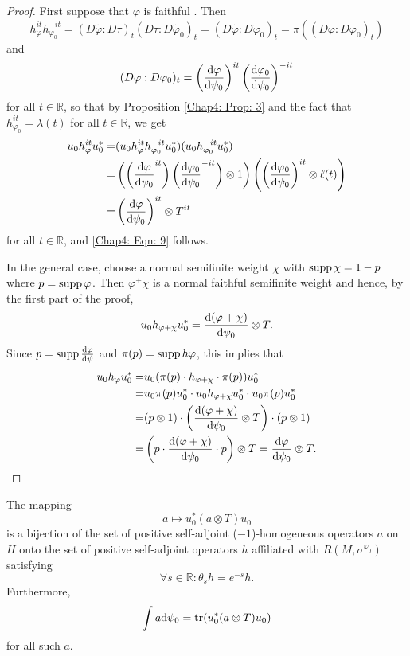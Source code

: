 \begin{proof}
    First suppose that $\varphi$ is faithful . Then
    \[
        h_\varphi^{it}h_{\varphi_0}^{-it}=(D\tilde{\varphi}:D\tau)_t(D\tau:D\tilde{\varphi}_0)_t=(D\tilde{\varphi}:D\tilde{\varphi}_0)_t=\pi((D\varphi:D\varphi_0)_t)
    \]
    and
    \[
        (D\varphi:D\varphi_0)_t=\left( \dv{\varphi}{\psi_0} \right)^{it}\left( \dv{\varphi_0}{\psi_0} \right)^{-it}
    \]
    for all $t\in \mathbb{R}$, so that by Proposition \ref{Chap4: Prop: 3} and the fact that $h_{\varphi_0}^{it}=\lambda(t)$ for all $t\in \mathbb{R}$, we get
    \[
        \begin{split}
            u_0h_\varphi^{it}u_0^*=&(u_0h_\varphi^{it}h_{\varphi_0}^{-it}u_0^*)(u_0h_{\varphi_0}^{-it}u_0^*)\\
            =&\left( \left( \dv{\varphi}{\psi_0}^{it}\right) \left( \dv{\varphi_0}{\psi_0}^{-it}  \right)\otimes 1 \right)\left( \left( \dv{\varphi_0}{\psi_0} \right)^{it}\otimes \ell(t) \right)\\
            =&\left( \dv{\varphi}{\psi_0} \right)^{it}\otimes T^{it}
        \end{split}
    \]
    for all $t\in \mathbb{R}$, and \eqref{Chap4: Eqn: 9} follows.\par
    In the general case, choose a normal semifinite weight $\chi$ with $\operatorname{supp} \chi=1-p$ where $p = \operatorname{supp} \varphi$. Then $\varphi^+ \chi$ is a normal faithful semifinite weight and hence, by the first part of the proof,
    \[
        u_0h_{\varphi+\chi}u_0^*=\dv{(\varphi+\chi)}{\psi_0}\otimes T.
    \]
    Since $p=\operatorname{supp} \dv{\varphi}{\psi}$ and $\pi(p)=\operatorname{supp} h\varphi$, this implies that
    \[
        \begin{split}
            u_0h_\varphi u_0^*=&u_0(\pi(p)\cdot h_{\varphi+\chi}\cdot \pi(p))u_0^*\\
            =&u_0\pi(p)u_0^*\cdot u_0 h_{\varphi+\chi}u_0^*\cdot u_0\pi(p)u_0^*\\
            =&(p\otimes 1)\cdot \left( \dv{(\varphi+\chi)}{\psi_0}\otimes T \right)\cdot (p\otimes 1)\\
            =&\left( p\cdot\dv{(\varphi+\chi)}{\psi_0}\cdot p \right)\otimes T=\dv{\varphi}{\psi_0}\otimes T.
        \end{split}
    \]
\end{proof}
\begin{corollary}\label{Chap4: Coro: 5}
    The mapping
    \[
        a\mapsto u_0^*(a\otimes T)u_0
    \]
    is a bijection of the set of positive self-adjoint ($-1$)-homogeneous operators $a$ on $H$ onto the set of positive self-adjoint operators $h$ affiliated with $R(M,\sigma^{\varphi_0})$ satisfying
    \begin{equation}
        \forall s\in \mathbb{R}:\theta_s h=e^{-s}h.
    \end{equation}
    Furthermore,
    \begin{equation}
        \int a\dd \psi_0=\tr(u_0^* (a\otimes T)u_0)
    \end{equation}
    for all such $a$.
\end{corollary}
